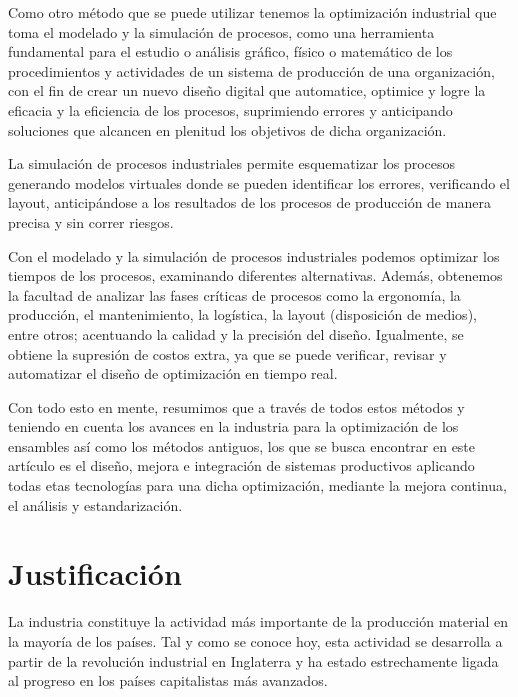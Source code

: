     
    Como otro método que se puede utilizar tenemos la optimización industrial que toma el modelado y la simulación de procesos, como una herramienta fundamental para el estudio o análisis gráfico, físico o matemático de los procedimientos y actividades de un sistema de producción de una organización, con el fin de crear un nuevo diseño digital que automatice, optimice y logre la eficacia y la eficiencia de los procesos, suprimiendo errores y anticipando soluciones que alcancen en plenitud los objetivos de dicha organización.
    
    La simulación de procesos industriales permite esquematizar los procesos generando modelos virtuales donde se pueden identificar los errores, verificando el layout, anticipándose a los resultados de los procesos de producción de manera precisa y sin correr riesgos.
    
    Con el modelado y la simulación de procesos industriales podemos optimizar los tiempos de los procesos, examinando diferentes alternativas. Además, obtenemos la facultad de analizar las fases críticas de procesos como la ergonomía, la producción, el mantenimiento, la logística, la layout (disposición de medios), entre otros; acentuando la calidad y la precisión del diseño. Igualmente, se obtiene la supresión de costos extra, ya que se puede verificar, revisar y automatizar el diseño de optimización en tiempo real. \cite{sanchez2015analisis}
    
    Con todo esto en mente, resumimos que a través de todos estos métodos y teniendo en cuenta los avances en la industria para la optimización de los ensambles así como los métodos antiguos, los que se busca encontrar en este artículo es el diseño, mejora e integración de sistemas productivos aplicando todas etas tecnologías para una dicha optimización, mediante la mejora continua, el análisis y estandarización.
    
    
    \section{Justificación}
    
    La industria constituye la actividad más importante de la producción material en la mayoría de los países. Tal y como se conoce hoy, esta actividad se desarrolla a partir de la revolución industrial en Inglaterra y ha estado estrechamente ligada al progreso en los países capitalistas más avanzados.
    
